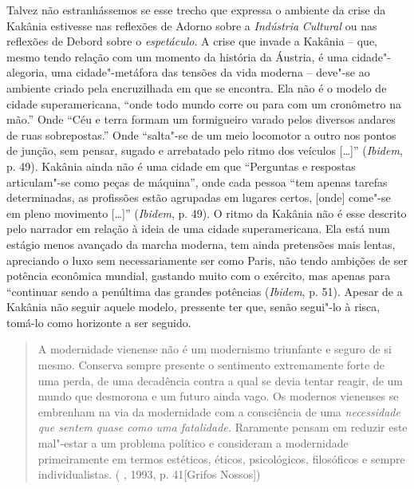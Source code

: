 {Talvez não estranhássemos se esse trecho que expressa o ambiente da
crise da Kakânia estivesse nas reflexões de Adorno sobre a
\emph{Indústria} \emph{Cultural} ou nas reflexões de Debord
sobre o \emph{espetáculo}. A crise que invade a Kakânia -- que,
mesmo tendo relação com um momento da história da Áustria, é uma
cidade"-alegoria, uma cidade"-metáfora das tensões da vida moderna --
deve"-se ao ambiente criado pela encruzilhada em que se encontra. Ela não é o modelo de cidade
superamericana, ``onde todo mundo corre ou para com um cronômetro na
mão.'' Onde ``Céu e terra formam um formigueiro varado pelos diversos
andares de ruas sobrepostas.'' Onde ``salta"-se de um meio locomotor a
outro nos pontos de junção, sem pensar, sugado e arrebatado pelo ritmo
dos veículos [\ldots{}]'' (\emph{Ibidem}, p. 49). Kakânia ainda não é uma cidade
em que ``Perguntas e respostas articulam"-se como peças de máquina'',
onde cada pessoa ``tem apenas tarefas determinadas, as profissões estão
agrupadas em lugares certos, [onde] come"-se em pleno movimento
[\ldots{}]'' (\emph{Ibidem}, p. 49). O ritmo da Kakânia não é esse descrito
pelo narrador em relação à ideia de uma cidade superamericana. Ela está
num estágio menos avançado da marcha moderna, tem ainda pretensões mais
lentas, apreciando o luxo sem necessariamente ser como Paris, não tendo
ambições de ser potência econômica mundial, gastando muito com o
exército, mas apenas para ``continuar sendo a penúltima das grandes
potências (\emph{Ibidem}, p. 51). Apesar de a Kakânia não seguir aquele
modelo, pressente ter que, senão segui"-lo à risca, tomá-lo como
horizonte a ser seguido.

\begin{quote}
A modernidade vienense não é um modernismo triunfante e seguro de si
mesmo. Conserva sempre presente o sentimento extremamente forte de uma
perda, de uma decadência contra a qual se devia tentar reagir, de um
mundo que desmorona e um futuro ainda vago. Os modernos vienenses se
embrenham na via da modernidade com a consciência de uma
\emph{necessidade que sentem quase como uma fatalidade.} Raramente
pensam em reduzir este mal"-estar a um problema político e consideram a
modernidade primeiramente em termos estéticos, éticos, psicológicos,
filosóficos e sempre individualistas. ( , 1993, p. 41[Grifos
Nossos])
\end{quote}

}
